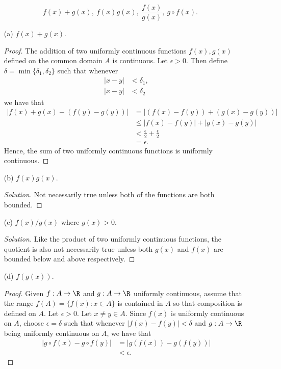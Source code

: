 \[ f(x) + g(x), ~ f(x)g(x), ~ \frac{ f(x) }{ g(x) }, ~ g \circ f (x).  \]


\begin{enumerate}
    \item[(a)] \( f(x) + g(x) \).
        \begin{proof}
        The addition of two uniformly continuous functions \( f(x), g(x) \) defined on the common domain \( A  \) is continuous. Let \( \epsilon > 0  \). Then define \( \delta = \min \{ \delta_1, \delta_2  \}  \) such that whenever 
        \begin{align*}
            | x - y  | &< \delta_1,  \\
            | x - y  | &< \delta_2 
        \end{align*}
        we have that 
        \begin{align*}
            | f(x) + g(x) - (f(y) - g(y)) | &= | (f(x) - f(y)) + (g(x) - g(y)) |  \\
                                            &\leq | f(x) - f(y)  | + | g(x) - g(y) | \\
                                            &< \frac{ \epsilon  }{ 2 } + \frac{ \epsilon  }{ 2 } \\
                                            &= \epsilon.
        \end{align*}
        Hence, the sum of two uniformly continuous functions is uniformly continuous.
        \end{proof}
    \item[(b)] \( f(x)g(x) \).
        \begin{proof}[Solution]
        Not necessarily true unless both of the functions are both bounded.

        \end{proof}
    \item[(c)] \( f(x) / g(x)  \) where \( g(x) > 0  \).
        \begin{proof}[Solution]
        Like the product of two uniformly continuous functions, the quotient is also not necessarily true unless both \( g(x) \) and \( f(x) \) are bounded below and above respectively.
        \end{proof}
    \item[(d)] \( f(g(x))  \).
        \begin{proof}
        Given \( f: A \to \R  \) and \( g:  A \to \R  \) uniformly continuous, assume that the range \( f(A) = \{ f(x) : x \in A  \}  \) is contained in \( A  \) so that composition is defined on \( A  \). Let \( \epsilon > 0  \). Let \( x \neq y \in A  \). Since \( f(x) \) is uniformly continuous on \( A  \), choose \( \epsilon  = \delta   \) such that whenever \( | f(x) - f(y)  | < \delta  \) and \( g : A \to \R  \) being uniformly continuous on \( A  \), we have that
        \begin{align*}
            | g \circ f (x) - g \circ f(y) | &= | g(f(x)) - g(f(y)) |  \\
                                             &< \epsilon.
        \end{align*}
        \end{proof}
\end{enumerate}


